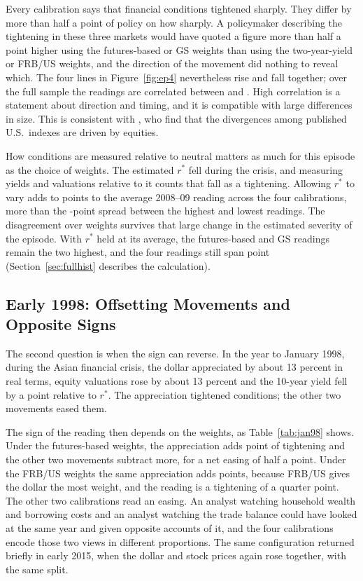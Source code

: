 Every calibration says that financial conditions tightened sharply. They differ by more than half a point of policy on how sharply. A policymaker describing the tightening in these three markets would have quoted a figure more than half a point higher using the futures-based or GS weights than using the two-year-yield or FRB/US weights, and the direction of the movement did nothing to reveal which. The four lines in Figure~\ref{fig:ep4} nevertheless rise and fall together; over the full sample the readings are correlated between  and . High correlation is a statement about direction and timing, and it is compatible with large differences in size. This is consistent with \citet{bletzinger2026}, who find that the divergences among published U.S.\ indexes are driven by equities.

How conditions are measured relative to neutral matters as much for this episode as the choice of weights. The estimated $r^*$ fell during the crisis, and measuring yields and valuations relative to it counts that fall as a tightening. Allowing $r^*$ to vary adds  to  points to the average 2008--09 reading across the four calibrations, more than the -point spread between the highest and lowest readings. The disagreement over weights survives that large change in the estimated severity of the episode. With $r^*$ held at its average, the futures-based and GS readings remain the two highest, and the four readings still span  point (Section~\ref{sec:fullhist} describes the calculation).

\subsection{Early 1998: Offsetting Movements and Opposite Signs}\label{sec:asia}
The second question is when the sign can reverse. In the year to January 1998, during the Asian financial crisis, the dollar appreciated by about 13 percent in real terms, equity valuations rose by about 13 percent and the 10-year yield fell by a point relative to $r^*$. The appreciation tightened conditions; the other two movements eased them.

The sign of the reading then depends on the weights, as Table~\ref{tab:jan98} shows. Under the futures-based weights, the appreciation adds  point of tightening and the other two movements subtract more, for a net easing of half a point. Under the FRB/US weights the same appreciation adds  points, because FRB/US gives the dollar the most weight, and the reading is a tightening of a quarter point. The other two calibrations read an easing. An analyst watching household wealth and borrowing costs and an analyst watching the trade balance could have looked at the same year and given opposite accounts of it, and the four calibrations encode those two views in different proportions. The same configuration returned briefly in early 2015, when the dollar and stock prices again rose together, with the same split.

